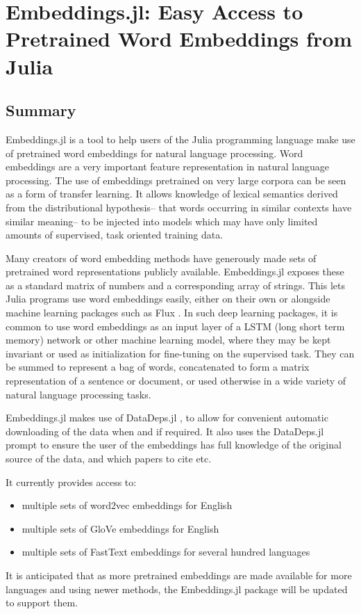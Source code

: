 \documentclass{book}
\begin{document}
\chapter{Embeddings.jl: Easy Access to Pretrained Word Embeddings from Julia}

\hypertarget{summary}{%
\section{Summary}}
Embeddings.jl is a tool to help users of the Julia programming language
\citep{Julia} make use of pretrained word embeddings for natural language
processing. Word embeddings are a very important feature representation
in natural language processing. The use of embeddings pretrained on very
large corpora can be seen as a form of transfer learning. It allows
knowledge of lexical semantics derived from the distributional
hypothesis-- that words occurring in similar contexts have similar
meaning-- to be injected into models which may have only limited amounts
of supervised, task oriented training data.

Many creators of word embedding methods have generously made sets of
pretrained word representations publicly available. Embeddings.jl
exposes these as a standard matrix of numbers and a corresponding array
of strings. This lets Julia programs use word embeddings easily, either
on their own or alongside machine learning packages such as Flux
\citep{flux}. In such deep learning packages, it is common to use word
embeddings as an input layer of a LSTM (long short term memory) network
or other machine learning model, where they may be kept invariant or
used as initialization for fine-tuning on the supervised task. They can
be summed to represent a bag of words, concatenated to form a matrix
representation of a sentence or document, or used otherwise in a wide
variety of natural language processing tasks.

Embeddings.jl makes use of DataDeps.jl  \citep{2018arXiv180801091W}, to allow for
convenient automatic downloading of the data when and if required. It
also uses the DataDeps.jl prompt to ensure the user of the embeddings
has full knowledge of the original source of the data, and which papers
to cite etc.

It currently provides access to:

\begin{itemize}
	\item
	multiple sets of word2vec embeddings \citep{mikolov2013efficient} for English
	\item
	multiple sets of GloVe embeddings \citep{pennington2014glove} for English
	\item
	multiple sets of FastText embeddings \citep{bojanowski2016enriching,fasttext157lang}
	for several hundred languages
\end{itemize}

It is anticipated that as more pretrained embeddings are made available
for more languages and using newer methods, the Embeddings.jl package
will be updated to support them.
\end{document}

